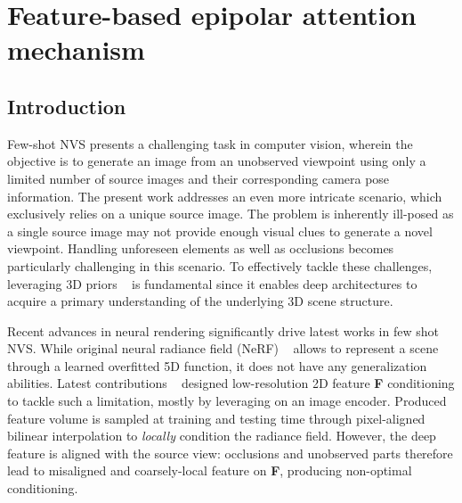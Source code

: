 \chapter{Feature-based epipolar attention mechanism}
\label{chapter:epinerf}



\section{Introduction}
Few-shot NVS presents a challenging task in computer vision, wherein the objective is to generate an image from an unobserved viewpoint using only a limited number of source images and their corresponding camera pose information. The present work addresses an even more intricate scenario, which exclusively relies on a unique source image. The problem is inherently ill-posed as a single source image may not provide enough visual clues to generate a novel viewpoint. Handling unforeseen elements as well as occlusions becomes particularly challenging in this scenario. To effectively tackle these challenges, leveraging 3D priors ~\citep{saito2019pifu,johari2022geonerf} is fundamental since it enables deep architectures to acquire a primary understanding of the underlying 3D scene structure. 

Recent advances in neural rendering significantly drive latest works in few shot NVS. While original neural radiance field (NeRF) ~\citep{mildenhall2020nerf} allows to represent a scene through a learned overfitted 5D function, it does not have any generalization abilities. Latest contributions ~\citep{yu2021pixelnerf,li2022symmnerf,lin2023vision} designed low-resolution 2D feature \textbf{F} conditioning to tackle such a limitation, mostly by leveraging on an image encoder. Produced feature volume is sampled at training and testing time through pixel-aligned bilinear interpolation to \textit{locally} condition the radiance field. However, the deep feature is aligned with the source view: occlusions and unobserved parts therefore lead to misaligned and coarsely-local feature on \textbf{F}, producing non-optimal conditioning. 

